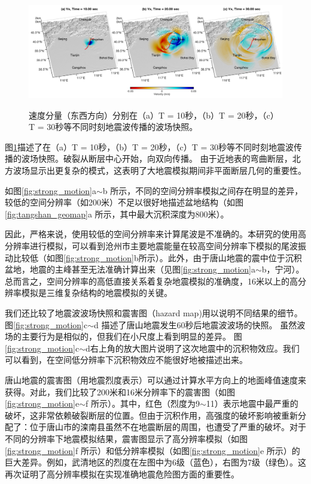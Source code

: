 \documentclass[degree=doctor]{thuthesis}
\begin{document}
\begin{figure}[ht]
    \includegraphics[width=1.0\columnwidth]{Snap_Vx_tangshan.pdf}\\
    \caption{速度分量（东西方向）分别在（a）T = 10秒，（b）T = 20秒，（c）T = 30秒等不同时刻地震波传播的波场快照。}
    \label{fig:strong_motion_2}
\end{figure}

图\ref{fig:strong_motion_2}描述了在（a）T = 10秒，（b）T = 20秒，（c）T = 30秒等不同时刻地震波传播的波场快照。破裂从断层中心开始，向双向传播。 由于近地表的弯曲断层，北方波场显示出更复杂的模式，这表明了大地震模拟期间非平面断层几何的重要性。

如图\ref{fig:strong_motion}a$\sim$b 所示，不同的空间分辨率模拟之间存在明显的差异，较低的空间分辨率（如200米）不足以很好地描述盆地结构（如图\ref{fig:tangshan_geomap}a 所示，其中最大沉积深度为800米）。


因此，严格来说，使用较低的空间分辨率来计算尾波是不准确的。本研究的使用高分辨率进行模拟，可以看到沧州市主要地震能量在较高空间分辨率下模拟的尾波振动比较低（如图\ref{fig:strong_motion}b所示）。此外，由于唐山地震的震中位于沉积盆地，地震的主峰甚至无法准确计算出来（见图\ref{fig:strong_motion}a$\sim$b，宁河）。总而言之，空间分辨率的高低直接关系着复杂地震模拟的准确度，16米以上的高分辨率模拟是三维复杂结构的地震模拟的关键。

我们还比较了地震波波场快照和震害图（hazard map)用以说明不同结果的细节。 图\ref{fig:strong_motion}c$\sim$d 描述了唐山地震发生60秒后地震波波场的快照。 虽然波场的主要行为是相似的，但我们在小尺度上看到明显的差异。 图\ref{fig:strong_motion}c$\sim$d右上角的放大图片说明了这次地震中的沉积物效应。我们可以看到，在空间低分辨率下沉积物效应不能很好地被描述出来。

唐山地震的震害图（用地震烈度表示）可以通过计算水平方向上的地面峰值速度来获得。对此，我们比较了200米和16米分辨率下的震害图（如图\ref{fig:strong_motion}e$\sim$f 所示）。其中，红色（烈度为9$\sim$11）表示地震中最严重的破坏，这非常依赖破裂断层的位置。但由于沉积作用，高强度的破坏影响被重新分配了：位于唐山市的滦南县虽然不在地震断层的周围，也遭受了严重的破坏。对于不同的分辨率下地震模拟结果，震害图显示了高分辨率模拟（如图\ref{fig:strong_motion}f 所示）和低分辨率模拟（如图\ref{fig:strong_motion}e 所示）的巨大差异。例如，武清地区的烈度在左图中为6级（蓝色），右图为7级（绿色）。这再次证明了高分辨率模拟在实现准确地震危险图方面的重要性。
\end{document}
